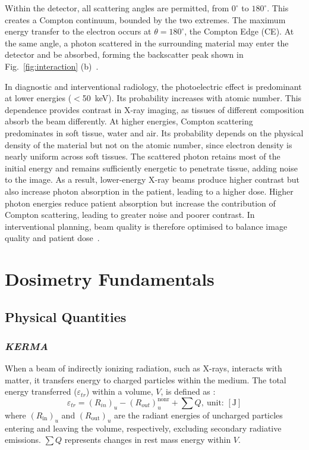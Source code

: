 Within the detector, all scattering angles are permitted, from $0^\circ$ to $180^\circ$. This creates a Compton continuum, bounded by the two extremes. The maximum energy transfer to the electron occurs at $\theta = 180^\circ$, the Compton Edge (CE). At the same angle, a photon scattered in the surrounding material may enter the detector and be absorbed, forming the backscatter peak shown in Fig.~\ref{fig:interaction} (b)~\cite{14}.

In diagnostic and interventional radiology, the photoelectric effect is predominant at lower energies ($<$50~keV). Its probability increases with atomic number. This dependence provides contrast in X-ray imaging, as tissues of different composition absorb the beam differently. At higher energies, Compton scattering predominates in soft tissue, water and air. Its probability depends on the physical density of the material but not on the atomic number, since electron density is nearly uniform across soft tissues. The scattered photon retains most of the initial energy and remains sufficiently energetic to penetrate tissue, adding noise to the image. As a result, lower-energy X-ray beams produce higher contrast but also increase photon absorption in the patient, leading to a higher dose. Higher photon energies reduce patient absorption but increase the contribution of Compton scattering, leading to greater noise and poorer contrast. In interventional planning, beam quality is therefore optimised to balance image quality and patient dose~\cite{5,6}.

\section{Dosimetry Fundamentals}

\subsection{Physical Quantities}
\subsubsection{\emph{KERMA}}
When a beam of indirectly ionizing radiation, such as X-rays, interacts with matter, it transfers energy to charged particles within the medium. The total energy transferred ($\varepsilon_{tr}$) within a volume, $V$, is defined as \cite{12}:
\begin{equation}
\varepsilon_{tr} = (R_{in})_u - (R_{out})_u^{\text{nonr}} + \sum Q,\ \text{unit: } [\mathrm{J}]
\label{eq:energy_transferred}
\end{equation}
\noindent where \((R_{\text{in}})_u\) and \((R_{\text{out}})_u\) are the radiant energies of uncharged particles entering and leaving the volume, respectively, excluding secondary radiative emissions. \(\sum Q\) represents changes in rest mass energy within \(V\).

